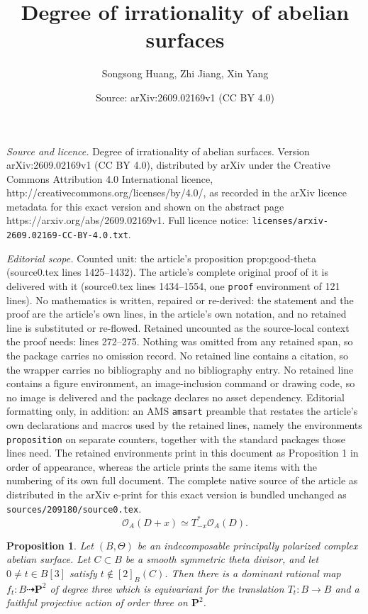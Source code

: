 \documentclass[10pt,a4paper]{amsart}
\title{Degree of irrationality of abelian surfaces}
\author{Songsong Huang, Zhi Jiang, Xin Yang}
\date{Source: arXiv:2609.02169v1 (CC BY 4.0)}
\newtheorem{proposition}{Proposition}
\newcommand{\PP}{\mathbf P}
\newcommand{\cO}{\mathcal O}
\begin{document}
\maketitle

\noindent\emph{Source and licence.} Degree of irrationality of abelian surfaces. Version arXiv:2609.02169v1 (CC BY 4.0), distributed by arXiv under the Creative Commons Attribution 4.0 International licence, http://creativecommons.org/licenses/by/4.0/, as recorded in the arXiv licence metadata for this exact version and shown on the abstract page https://arxiv.org/abs/2609.02169v1. Full licence notice: \texttt{licenses/arxiv-2609.02169-CC-BY-4.0.txt}.\par\smallskip

\noindent\textit{Editorial scope.} Counted unit: the article's proposition prop:good-theta (source0.tex lines 1425--1432). The article's complete original proof of it is delivered with it (source0.tex lines 1434--1554, one \texttt{proof} environment of 121 lines). No mathematics is written, repaired or re-derived: the statement and the proof are the article's own lines, in the article's own notation, and no retained line is substituted or re-flowed.  Retained uncounted as the source-local context the proof needs: lines 272--275.  Nothing was omitted from any retained span, so the package carries no omission record.  No retained line contains a citation, so the wrapper carries no bibliography and no bibliography entry.  No retained line contains a figure environment, an image-inclusion command or drawing code, so no image is delivered and the package declares no asset dependency.  Editorial formatting only, in addition: an AMS \texttt{amsart} preamble that restates the article's own declarations and macros used by the retained lines, namely the environments \texttt{proposition} on separate counters, together with the standard packages those lines need.  The retained environments print in this document as Proposition 1 in order of appearance, whereas the article prints the same items with the numbering of its own full document.  The complete native source of the article as distributed in the arXiv e-print for this exact version is bundled unchanged as \texttt{sources/209180/source0.tex}.
\begin{equation}
  \cO_A(D+x)\simeq T_{-x}^*\cO_A(D).
\label{eq:translate-convention}
\end{equation}

\begin{proposition}\label{prop:good-theta}
Let $(B,\Theta)$ be an indecomposable principally polarized complex
abelian surface.  Let $C\subset B$ be a smooth symmetric theta divisor,
and let $0\neq t\in B[3]$ satisfy $t\notin[2]_B(C)$.  Then there is a
dominant rational map $f_t:B\dashrightarrow\PP^2$
of degree three which is equivariant for the translation
$T_t:B\to B$ and a faithful projective action of order three on $\PP^2$.
\end{proposition}
\end{document}
